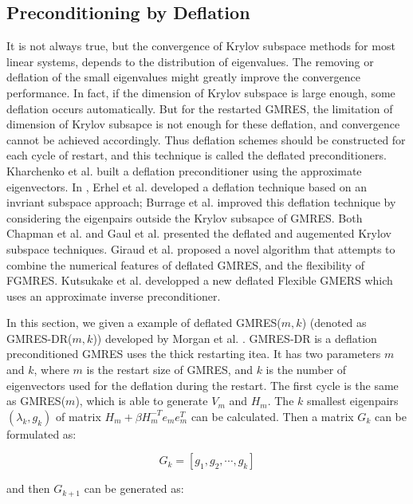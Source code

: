 \subsection{Preconditioning by Deflation}

It is not always true, but the convergence of Krylov subspace methods for most linear systems, depends to the distribution of eigenvalues. The removing or deflation of the small eigenvalues might greatly improve the convergence performance. In fact, if the dimension of Krylov subspace is large enough, some deflation occurs automatically. But for the restarted GMRES, the limitation of dimension of Krylov subsapce is not enough for these deflation, and convergence cannot be achieved accordingly. Thus deflation schemes should be constructed for each cycle of restart, and this technique is called the deflated preconditioners. Kharchenko et al. \cite{kharchenko1995eigenvalue} built a deflation preconditioner using the approximate eigenvectors. In \cite{erhel1996restarted}, Erhel et al. developed a deflation technique based on an invriant subspace approach; Burrage et al.  \cite{burrage1998deflation} improved this deflation technique by considering the eigenpairs outside the Krylov subsapce of GMRES. Both Chapman et al. \cite{chapman1997deflated} and Gaul et al. \cite{gaul2013framework} presented the deflated and augemented Krylov subspace techniques. Giraud et al. \cite{giraud2010flexible} proposed a novel algorithm that attempts to combine the numerical features of deflated GMRES, and the flexibility of FGMRES. Kutsukake et al. \cite{kutsukake2015deflated} developped a new deflated Flexible GMERS which uses an approximate inverse preconditioner. 

In this section, we given a example of deflated GMRES($m,k$) (denoted as GMRES-DR($m,k$)) developed by Morgan et al. \cite{morgan2002gmres}. GMRES-DR is a deflation preconditioned GMRES uses the thick restarting itea. It has two parameters $m$ and $k$, where $m$ is the restart size of GMRES, and $k$ is the number of eigenvectors used for the deflation during the restart. The first cycle is the same as GMRES($m$), which is able to generate $V_m$ and $H_m$. The $k$ smallest eigenpairs $(\lambda_k, g_k)$ of matrix $H_m+\beta H_m^{-T}e_me_m^T$ can be calculated. Then a matrix $G_k$ can be formulated as:

\begin{equation}
	 G_k=[g_1,g_2,\cdots,g_k]
\end{equation}

and then $G_{k+1}$ can be generated as:

